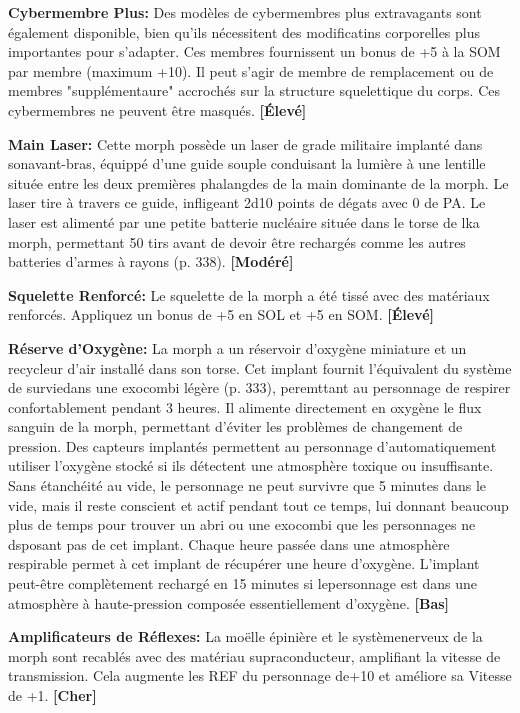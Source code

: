 \textbf{Cybermembre Plus:} Des modèles de cybermembres plus extravagants sont également disponible, bien qu'ils nécessitent des modificatins corporelles plus importantes pour s'adapter. Ces membres fournissent un bonus de +5 à la SOM par membre (maximum +10). Il peut s'agir de membre de remplacement ou de membres "supplémentaure" accrochés sur la structure squelettique du corps. Ces cybermembres ne peuvent être masqués. \textbf{[Élevé]} 

\textbf{Main Laser:} Cette morph possède un laser de grade militaire implanté dans sonavant-bras, équippé d'une guide souple conduisant la lumière à une lentille située entre les deux premières phalangdes de la main dominante de la morph. Le laser tire à travers ce guide, infligeant 2d10 points de dégats avec 0 de PA. Le laser est alimenté par une petite batterie nucléaire située dans le torse de lka morph, permettant 50 tirs avant de devoir être rechargés comme les autres batteries d'armes à rayons (p. 338). \textbf{[Modéré]} 

\textbf{Squelette Renforcé:} Le squelette de la morph a été tissé avec des matériaux renforcés. Appliquez un bonus de +5 en SOL et +5 en SOM. \textbf{[Élevé]} 

\textbf{Réserve d'Oxygène:} La morph a un réservoir d'oxygène miniature et un recycleur d'air installé dans son torse. Cet implant fournit l'équivalent du système de surviedans une exocombi légère (p. 333), peremttant au personnage de respirer confortablement pendant 3 heures. Il alimente directement en oxygène le flux sanguin de la morph, permettant d'éviter les problèmes de changement de pression. Des capteurs implantés permettent au personnage d'automatiquement utiliser l'oxygène stocké si ils détectent une atmosphère toxique ou insuffisante. Sans étanchéité au vide, le personnage ne peut survivre que 5 minutes dans le vide, mais il reste conscient et actif pendant tout ce temps, lui donnant beaucoup plus de temps pour trouver un abri ou une exocombi que les personnages ne dsposant pas de cet implant. Chaque heure passée dans une atmosphère respirable permet à cet implant de récupérer une heure d'oxygène. L'implant peut-être complètement rechargé en 15 minutes si lepersonnage est dans une atmosphère à haute-pression composée essentiellement d'oxygène. \textbf{[Bas]} 

\textbf{Amplificateurs de Réflexes:} La moëlle épinière et le systèmenerveux de la morph sont recablés avec des matériau supraconducteur, amplifiant la vitesse de transmission. Cela augmente les REF du personnage de+10 et améliore sa Vitesse de +1. \textbf{[Cher]} 


